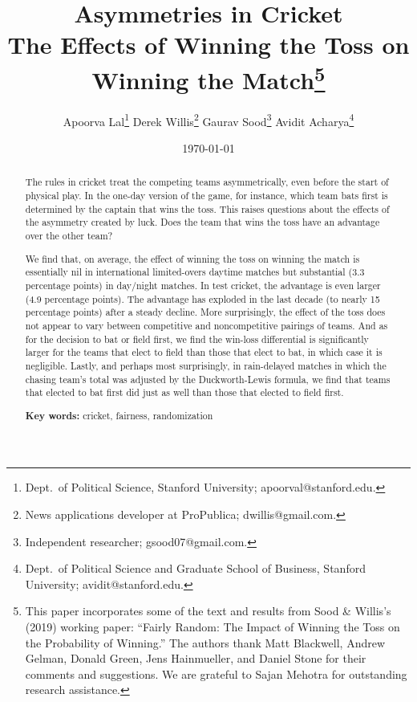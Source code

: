 \documentclass[11pt,  letterpaper]{article}
\title{\textbf{Asymmetries in Cricket \\ \vspace{5pt} \large{The Effects of Winning the Toss on Winning the Match}}\thanks{This paper incorporates some of the text and 
results from Sood \& Willis's (2019) working paper: ``Fairly Random: The Impact of Winning the Toss on the Probability of Winning.'' The authors thank Matt Blackwell, 
Andrew Gelman, Donald Green, Jens Hainmueller, and Daniel Stone for their comments and suggestions. We are grateful to Sajan Mehotra for outstanding research assistance. 
}}
\author{
Apoorva Lal\thanks{Dept.~of Political Science, Stanford University;  \textsf{apoorval@stanford.edu}.} \;\;
Derek Willis\thanks{News applications developer at ProPublica;  \textsf{dwillis@gmail.com}.}  \;\;
Gaurav Sood\thanks{Independent researcher;  \textsf{gsood07@gmail.com}.} \;\;
Avidit Acharya\thanks{Dept.~of Political Science and Graduate School of Business, Stanford University; \textsf{avidit@stanford.edu}.}
}
\date{\today}
\begin{document}
\maketitle

\begin{abstract}

The rules in cricket treat the competing teams asymmetrically, even before the start of physical play. In the one-day version of the game, for instance, which team bats first is determined by the captain that wins the toss. This raises questions about the effects of the asymmetry created by luck. Does the team that wins the toss have an advantage over the other team?

We find that, on average, the effect of winning the toss on winning the match is essentially nil in international limited-overs daytime matches but substantial (3.3 percentage points) in day/night matches. In test cricket, the advantage is even larger (4.9 percentage points). The advantage has exploded in the last decade (to nearly 15 percentage points) after a steady decline. More surprisingly, the effect of the toss does not appear to vary between competitive and noncompetitive pairings of teams. And as for the decision to bat or field first, we find the win-loss differential is significantly larger for the teams that elect to field than those that elect to bat, in which case it is negligible. Lastly, and perhaps most surprisingly, in rain-delayed matches in which the chasing team's total was adjusted by the Duckworth-Lewis formula, we find that teams that elected to bat first did just as well than those that elected to field first.

\smallskip

\textbf{Key words:} cricket, fairness, randomization

\end{abstract}




%
\end{document}
